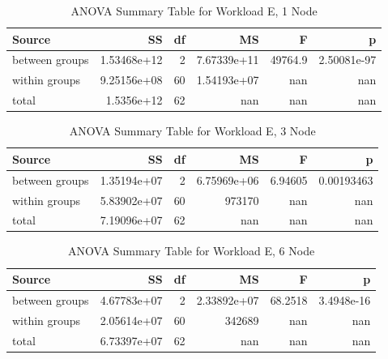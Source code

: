 \begin{table}
\begin{tabular}{lrrrrr}
\toprule
         Source &          SS &  df &          MS &       F &           p \\
\midrule
 between groups & 1.53468e+12 &   2 & 7.67339e+11 & 49764.9 & 2.50081e-97 \\
  within groups & 9.25156e+08 &  60 & 1.54193e+07 &     nan &         nan \\
          total &  1.5356e+12 &  62 &         nan &     nan &         nan \\
\bottomrule
\end{tabular}
\caption{ANOVA Summary Table for Workload E, 1 Node}
\label{table:ram_variance_analysis_workload_e_1_node}
\end{table}

\begin{table}
\begin{tabular}{lrrrrr}
\toprule
         Source &          SS &  df &          MS &       F &          p \\
\midrule
 between groups & 1.35194e+07 &   2 & 6.75969e+06 & 6.94605 & 0.00193463 \\
  within groups & 5.83902e+07 &  60 &      973170 &     nan &        nan \\
          total & 7.19096e+07 &  62 &         nan &     nan &        nan \\
\bottomrule
\end{tabular}
\caption{ANOVA Summary Table for Workload E, 3 Node}
\label{table:ram_variance_analysis_workload_e_3_node}
\end{table}

\begin{table}
\begin{tabular}{lrrrrr}
\toprule
         Source &          SS &  df &          MS &       F &          p \\
\midrule
 between groups & 4.67783e+07 &   2 & 2.33892e+07 & 68.2518 & 3.4948e-16 \\
  within groups & 2.05614e+07 &  60 &      342689 &     nan &        nan \\
          total & 6.73397e+07 &  62 &         nan &     nan &        nan \\
\bottomrule
\end{tabular}
\caption{ANOVA Summary Table for Workload E, 6 Node}
\label{table:ram_variance_analysis_workload_e_6_node}
\end{table}

